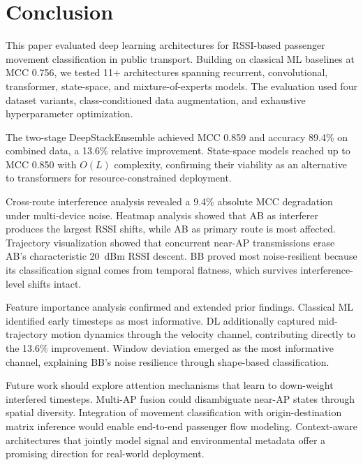 \section{Conclusion}

This paper evaluated deep learning architectures for RSSI-based passenger movement classification in public transport. Building on classical ML baselines at MCC 0.756, we tested 11+ architectures spanning recurrent, convolutional, transformer, state-space, and mixture-of-experts models. The evaluation used four dataset variants, class-conditioned data augmentation, and exhaustive hyperparameter optimization.

The two-stage DeepStackEnsemble achieved MCC 0.859 and accuracy 89.4\% on combined data, a 13.6\% relative improvement. State-space models reached up to MCC 0.850 with $O(L)$ complexity, confirming their viability as an alternative to transformers for resource-constrained deployment.

Cross-route interference analysis revealed a 9.4\% absolute MCC degradation under multi-device noise. Heatmap analysis showed that AB as interferer produces the largest RSSI shifts, while AB as primary route is most affected. Trajectory visualization showed that concurrent near-AP transmissions erase AB's characteristic 20~dBm RSSI descent. BB proved most noise-resilient because its classification signal comes from temporal flatness, which survives interference-level shifts intact.

Feature importance analysis confirmed and extended prior findings. Classical ML identified early timesteps as most informative. DL additionally captured mid-trajectory motion dynamics through the velocity channel, contributing directly to the 13.6\% improvement. Window deviation emerged as the most informative channel, explaining BB's noise resilience through shape-based classification.

Future work should explore attention mechanisms that learn to down-weight interfered timesteps. Multi-AP fusion could disambiguate near-AP states through spatial diversity. Integration of movement classification with origin-destination matrix inference would enable end-to-end passenger flow modeling. Context-aware architectures that jointly model signal and environmental metadata offer a promising direction for real-world deployment.
